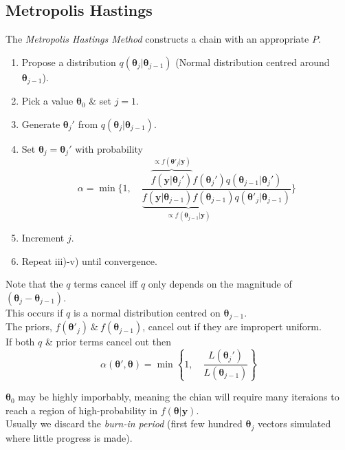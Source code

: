 \documentclass[11pt,a4paper]{article}
\begin{document}
\subsection{Metropolis Hastings}

The \textit{Metropolis Hastings Method} constructs a chain with an appropriate $P$.\\
\begin{enumerate}
	\item Propose a distribution $q(\pmb\theta_j|\pmb\theta_{j-1})$ (\eg Normal distribution centred around $\pmb\theta_{j-1}$).
	\item Pick a value $\pmb\theta_0$ \& set $j=1$.
	\item Generate $\pmb\theta_j'$ from $q(\pmb\theta_j|\pmb\theta_{j-1})$.
	\item Set $\pmb\theta_j=\pmb\theta_j'$ with probability
	$$\alpha=\min\bigg\{1,\quad\dfrac{\overbrace{f(\textbf{y}|\pmb\theta_j')}^{\propto f(\pmb\theta'_j|\mathbf{y})}f(\pmb\theta_j')q(\pmb\theta_{j-1}|\pmb\theta_j')}{\underbrace{f(\textbf{y}|\pmb\theta_{j-1})f(\pmb\theta_{j-1})}_{\propto f(\pmb\theta_{j-1}|\mathbf{y})}q(\pmb\theta'_j|\pmb\theta_{j-1})}\bigg\}$$
	\item Increment $j$.
	\item Repeat iii)-v) until convergence.
\end{enumerate}

Note that the $q$ terms cancel iff $q$ only depends on the magnitude of $(\pmb\theta_j-\pmb\theta_{j-1})$.\\
This occurs if $q$ is a normal distribution centred on $\pmb\theta_{j-1}$.\\
The priors, $f(\pmb\theta'_j)\ \&\ f(\pmb\theta_{j-1})$, cancel out if they are impropert uniform.\\
If both $q$ \& prior terms cancel out then
$$\alpha(\pmb\theta',\pmb\theta)=\min\left\{1,\quad\dfrac{L(\pmb\theta_j')}{L(\pmb\theta_{j-1})}\right\}$$

$\pmb\theta_0$ may be highly imporbably, meaning the chian will require many iteraions to reach a region of high-probability in $f(\pmb\theta|\textbf{y})$.\\
Usually we discard the \textit{burn-in period} (\ie first few hundred $\pmb\theta_j$ vectors simulated where little progress is made).\\
\end{document}
